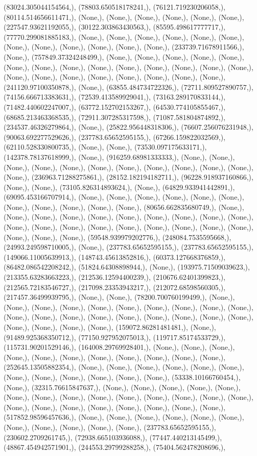 \documentclass{article}
\begin{document}
(83024.305044154564,), (78803.650518178241,), (76121.719230206058,), (80114.514656611471,), (None,), (None,), (None,), (None,), (None,), (None,), (227547.93621192055,), (30122.303863430563,), (85595.498617777717,), (77770.299081885183,), (None,), (None,), (None,), (None,), (None,), (None,), (None,), (None,), (None,), (None,), (None,), (None,), (233739.71678911566,), (None,), (757849.37324248499,), (None,), (None,), (None,), (None,), (None,), (None,), (None,), (None,), (None,), (None,), (None,), (None,), (None,), (None,), (None,), (None,), (None,), (None,), (None,), (None,), (None,), (None,), (241120.97100350878,), (None,), (63855.484734722326,), (72711.809527890757,), (74156.666713383631,), (72539.413589929041,), (73163.289170833144,), (71482.440602247007,), (63772.152702153267,), (64530.774105855467,), (68685.213463368535,), (72911.307285317598,), (71087.581804874892,), (234537.46326279864,), (None,), (25822.956448318306,), (76607.256076231948,), (90063.692277529626,), (237783.65652595155,), (67266.159822032569,), (62110.528330800735,), (None,), (None,), (73530.097175633171,), (142378.78137618999,), (None,), (916259.68981333333,), (None,), (None,), (None,), (None,), (None,), (None,), (None,), (None,), (None,), (None,), (None,), (None,), (236963.71288275861,), (28152.182194182711,), (96228.918937160866,), (None,), (None,), (73105.826314893624,), (None,), (64829.933941442891,), (69095.453166707914,), (None,), (None,), (None,), (None,), (None,), (None,), (None,), (None,), (None,), (None,), (None,), (80656.662835680749,), (None,), (None,), (None,), (None,), (None,), (None,), (None,), (None,), (None,), (None,), (None,), (None,), (None,), (None,), (None,), (None,), (None,), (None,), (None,), (None,), (None,), (None,), (59548.939979202776,), (248084.7535595668,), (24993.249598710005,), (None,), (237783.65652595155,), (237783.65652595155,), (149066.11005639913,), (148743.45613852816,), (60373.127668376859,), (86482.086542208242,), (51824.64308898944,), (None,), (193975.71509039623,), (213355.63283663223,), (212536.12594400239,), (210676.62401399823,), (212565.72183546727,), (217098.23353943217,), (212072.68598560305,), (217457.36499939795,), (None,), (None,), (78200.700760199499,), (None,), (None,), (None,), (None,), (None,), (None,), (None,), (None,), (None,), (None,), (None,), (None,), (None,), (None,), (None,), (None,), (None,), (None,), (None,), (None,), (None,), (None,), (None,), (159072.86281481481,), (None,), (91489.925368350712,), (77150.927952075013,), (119717.85174533729,), (115731.90201529146,), (164008.29769928401,), (None,), (None,), (None,), (None,), (None,), (None,), (None,), (None,), (None,), (None,), (None,), (252645.13505882354,), (None,), (None,), (None,), (None,), (None,), (None,), (None,), (None,), (None,), (None,), (None,), (None,), (53338.10166760454,), (None,), (32315.76615847637,), (None,), (None,), (None,), (None,), (None,), (None,), (None,), (None,), (None,), (None,), (None,), (None,), (None,), (None,), (None,), (None,), (None,), (None,), (None,), (None,), (None,), (None,), (517852.98596457636,), (None,), (None,), (None,), (None,), (None,), (None,), (None,), (None,), (None,), (None,), (None,), (237783.65652595155,), (230602.2709261745,), (72938.665103936088,), (77447.440213145499,), (48867.454942571901,), (244553.29799288258,), (75404.562478208696,), 
\end{document}
